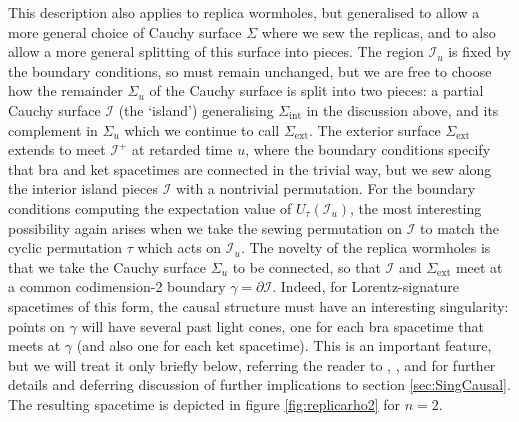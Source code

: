 \documentclass[letterpaper,12pt]{article}
\newcommand*{\scri}{\mathscr{I}} %
\newcommand*{\island}{\mathcal{I}}
\begin{document}
This description also applies to replica wormholes, but generalised to allow a more general choice of Cauchy surface $\Sigma$ where we sew the replicas, and to also allow a more general splitting of this surface into pieces. The region $\scri_u$ is fixed by the boundary conditions, so must remain unchanged, but we are free to choose how the remainder $\Sigma_u$ of the Cauchy surface is split into two pieces: a partial Cauchy surface $\island$ (the `island') generalising $\Sigma_\mathrm{int}$ in the discussion above, and its complement in $\Sigma_u$ which we continue to call $\Sigma_\mathrm{ext}$. The exterior surface $\Sigma_{\mathrm{ext}}$ extends to meet $\scri^+$ at retarded time $u$, where the boundary conditions specify that bra and ket spacetimes are connected in the trivial way, but we sew along the interior island pieces $\island$ with a nontrivial permutation. For the boundary conditions computing the expectation value of $U_\tau(\scri_u)$, the most interesting possibility again arises when we take the sewing permutation on $\island$ to match the cyclic permutation $\tau$ which acts on $\scri_u$. The novelty of the replica wormholes is that we take the Cauchy surface $\Sigma_u$ to be connected, so that $\island$ and $\Sigma_{\mathrm{ext}}$ meet at a common codimension-2 boundary $\gamma = \partial\island$. Indeed, for Lorentz-signature spacetimes of this form, the causal structure must have an interesting singularity:  points on $\gamma$ will have several past light cones, one for each bra spacetime that meets at $\gamma$ (and also one for each ket spacetime).  This is an important feature, but we will treat it only briefly below, referring the reader to \cite{Louko:1995jw}, \cite{Dong:2016hjy}, and \cite{CDMRW} for further details and deferring discussion of further implications to section \ref{sec:SingCausal}. The resulting spacetime is depicted in figure \ref{fig:replicarho2} for $n=2$.
\end{document}
